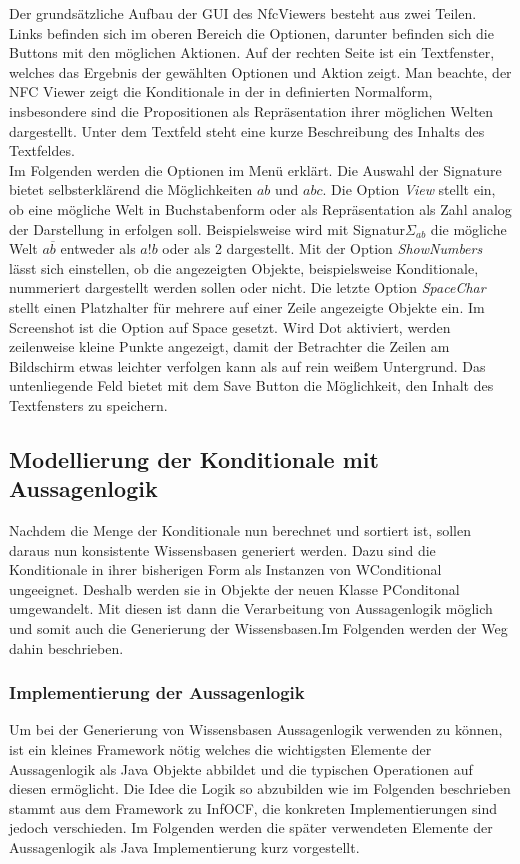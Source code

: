 \documentclass[12pt,a4paper]{article}
\begin{document}
Der grundsätzliche Aufbau der GUI des NfcViewers besteht aus zwei Teilen. Links befinden sich im oberen Bereich die Optionen, darunter befinden sich die Buttons mit den möglichen Aktionen. Auf der rechten Seite ist ein Textfenster, welches das Ergebnis der gewählten Optionen und Aktion zeigt. Man beachte, der NFC Viewer zeigt die Konditionale in der in \cite{beierle19} definierten Normalform, insbesondere sind die Propositionen als Repräsentation ihrer möglichen Welten dargestellt. Unter dem Textfeld steht eine kurze Beschreibung des Inhalts des Textfeldes. \\
Im Folgenden werden die Optionen im Menü erklärt. Die Auswahl der Signature bietet selbsterklärend die Möglichkeiten $ab$ und $abc$. Die Option \textit{View} stellt ein, ob eine mögliche Welt in Buchstabenform oder als Repräsentation als Zahl analog der Darstellung in \cite{beierle19} erfolgen soll. Beispielsweise wird mit Signatur$\Sigma_{ab}$ die mögliche Welt $a \overline{b}$ entweder als $a!b$ oder als 2 dargestellt. Mit der Option \textit{ShowNumbers} lässt sich einstellen, ob die angezeigten Objekte, beispielsweise Konditionale, nummeriert dargestellt werden sollen oder nicht. Die letzte Option \textit{SpaceChar} stellt einen Platzhalter für mehrere auf einer Zeile angezeigte Objekte ein. Im Screenshot ist die Option auf Space gesetzt. Wird Dot aktiviert, werden zeilenweise kleine Punkte angezeigt, damit der Betrachter die Zeilen am Bildschirm etwas leichter verfolgen kann als auf rein weißem Untergrund. Das untenliegende Feld bietet mit dem Save Button die Möglichkeit, den Inhalt des Textfensters zu speichern.



\subsection{Modellierung der Konditionale mit Aussagenlogik}
Nachdem die Menge der Konditionale nun berechnet und sortiert ist, sollen daraus nun konsistente Wissensbasen generiert werden. Dazu sind die Konditionale in ihrer bisherigen Form als Instanzen von WConditional ungeeignet. Deshalb werden sie in Objekte der neuen Klasse PConditonal umgewandelt. Mit diesen ist dann die Verarbeitung von Aussagenlogik möglich und somit auch die Generierung der Wissensbasen.Im Folgenden werden der Weg dahin beschrieben.




\subsubsection{Implementierung der Aussagenlogik}
\label{sec:logic}
Um bei der Generierung von Wissensbasen Aussagenlogik verwenden zu können, ist ein kleines Framework nötig welches die wichtigsten Elemente der Aussagenlogik als Java Objekte abbildet und die typischen Operationen auf diesen ermöglicht. Die Idee die Logik so abzubilden wie im Folgenden beschrieben stammt aus dem Framework zu InfOCF, die konkreten Implementierungen sind jedoch verschieden. Im Folgenden werden die später verwendeten Elemente der Aussagenlogik als Java Implementierung kurz vorgestellt.
\end{document}
